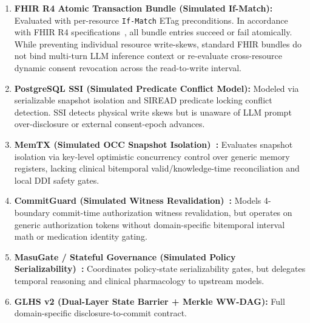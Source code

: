 \documentclass[11pt]{article}
\begin{document}
\begin{enumerate}
  \item \textbf{FHIR R4 Atomic Transaction Bundle (Simulated If-Match):} Evaluated with per-resource \texttt{If-Match} ETag preconditions. In accordance with FHIR R4 specifications~\cite{fhirhttp}, all bundle entries succeed or fail atomically. While preventing individual resource write-skews, standard FHIR bundles do not bind multi-turn LLM inference context or re-evaluate cross-resource dynamic consent revocation across the read-to-write interval.
  \item \textbf{PostgreSQL SSI (Simulated Predicate Conflict Model):} Modeled via serializable snapshot isolation and SIREAD predicate locking conflict detection. SSI detects physical write skews but is unaware of LLM prompt over-disclosure or external consent-epoch advances.
  \item \textbf{MemTX (Simulated OCC Snapshot Isolation)~\cite{memtx}:} Evaluates snapshot isolation via key-level optimistic concurrency control over generic memory registers, lacking clinical bitemporal valid/knowledge-time reconciliation and local DDI safety gates.
  \item \textbf{CommitGuard (Simulated Witness Revalidation)~\cite{temporaryauth}:} Models 4-boundary commit-time authorization witness revalidation, but operates on generic authorization tokens without domain-specific bitemporal interval math or medication identity gating.
  \item \textbf{MasuGate / Stateful Governance (Simulated Policy Serializability)~\cite{statefulgov}:} Coordinates policy-state serializability gates, but delegates temporal reasoning and clinical pharmacology to upstream models.
  \item \textbf{GLHS v2 (Dual-Layer State Barrier + Merkle WW-DAG):} Full domain-specific disclosure-to-commit contract.
\end{enumerate}
\end{document}
